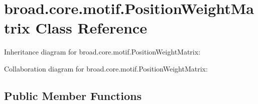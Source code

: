 \hypertarget{classbroad_1_1core_1_1motif_1_1_position_weight_matrix}{\section{broad.\+core.\+motif.\+Position\+Weight\+Matrix Class Reference}
\label{classbroad_1_1core_1_1motif_1_1_position_weight_matrix}
}


Inheritance diagram for broad.\+core.\+motif.\+Position\+Weight\+Matrix\+:


Collaboration diagram for broad.\+core.\+motif.\+Position\+Weight\+Matrix\+:
\subsection*{Public Member Functions}

